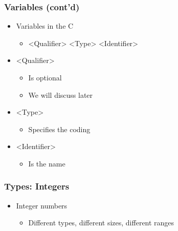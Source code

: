 \documentclass{../c-lecture}
\begin{document}
\begin{frame}
  \frametitle{Variables (cont’d)}
  \begin{itemize}
    \item Variables in the C
    \begin{itemize}
      \item <Qualifier> <Type> <Identifier>
    \end{itemize}
    \item {\color{Orange} <Qualifier>}
    \begin{itemize}
      \item Is optional
      \item We will discuss later
    \end{itemize}
    \item {\color{Green}<Type>}
    \begin{itemize}
      \item Specifies the coding
    \end{itemize}
    \item {\color{Cyan}<Identifier>}
    \begin{itemize}
      \item Is the name
    \end{itemize}
  \end{itemize}
\end{frame}

\begin{frame}
  \frametitle{Types: Integers}
  \begin{itemize}
    \item Integer numbers
    \begin{itemize}
      \item Different types, different sizes, different ranges
    \end{itemize}
  \end{itemize}
\end{frame}
\end{document}
